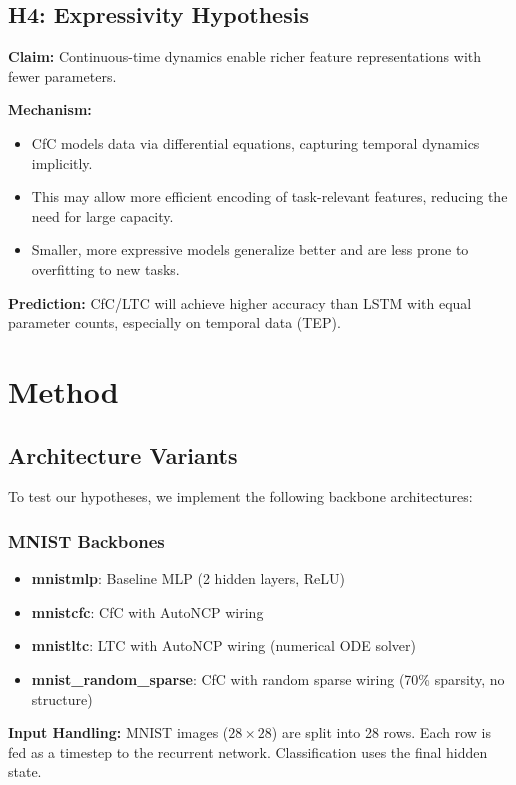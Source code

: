 \documentclass[11pt,twocolumn]{article}
\begin{document}
\subsection{H4: Expressivity Hypothesis}

\textbf{Claim:} Continuous-time dynamics enable richer feature representations with fewer parameters.

\textbf{Mechanism:}
\begin{itemize}
    \item CfC models data via differential equations, capturing temporal dynamics implicitly.
    \item This may allow more efficient encoding of task-relevant features, reducing the need for large capacity.
    \item Smaller, more expressive models generalize better and are less prone to overfitting to new tasks.
\end{itemize}

\textbf{Prediction:} CfC/LTC will achieve higher accuracy than LSTM with equal parameter counts, especially on temporal data (TEP).

\section{Method}

\subsection{Architecture Variants}

To test our hypotheses, we implement the following backbone architectures:

\subsubsection{MNIST Backbones}

\begin{itemize}
    \item \textbf{mnistmlp}: Baseline MLP (2 hidden layers, ReLU)
    \item \textbf{mnistcfc}: CfC with AutoNCP wiring
    \item \textbf{mnistltc}: LTC with AutoNCP wiring (numerical ODE solver)
    \item \textbf{mnist\_random\_sparse}: CfC with random sparse wiring (70\% sparsity, no structure)
\end{itemize}

\textbf{Input Handling:} MNIST images ($28 \times 28$) are split into 28 rows. Each row is fed as a timestep to the recurrent network. Classification uses the final hidden state.
\end{document}
